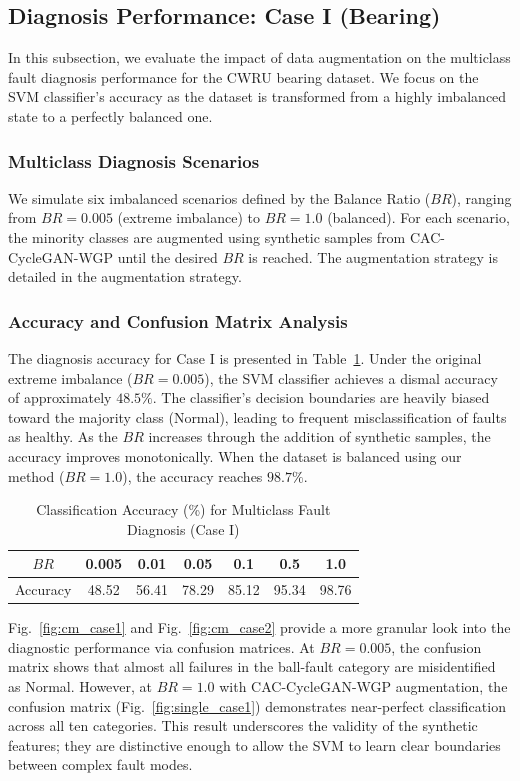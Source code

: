 \subsection{Diagnosis Performance: Case I (Bearing)}
In this subsection, we evaluate the impact of data augmentation on the multiclass fault diagnosis performance for the CWRU bearing dataset. We focus on the SVM classifier's accuracy as the dataset is transformed from a highly imbalanced state to a perfectly balanced one.

\subsubsection{Multiclass Diagnosis Scenarios}
We simulate six imbalanced scenarios defined by the Balance Ratio ($BR$), ranging from $BR=0.005$ (extreme imbalance) to $BR=1.0$ (balanced). For each scenario, the minority classes are augmented using synthetic samples from CAC-CycleGAN-WGP until the desired $BR$ is reached. The augmentation strategy is detailed in the augmentation strategy.

\subsubsection{Accuracy and Confusion Matrix Analysis}
The diagnosis accuracy for Case I is presented in Table~\ref{tab:acc_case1}. Under the original extreme imbalance ($BR=0.005$), the SVM classifier achieves a dismal accuracy of approximately $48.5\%$. The classifier's decision boundaries are heavily biased toward the majority class (Normal), leading to frequent misclassification of faults as healthy. As the $BR$ increases through the addition of synthetic samples, the accuracy improves monotonically. When the dataset is balanced using our method ($BR=1.0$), the accuracy reaches $98.7\%$.

\begin{table}[htbp]
\centering
\caption{Classification Accuracy (\%) for Multiclass Fault Diagnosis (Case I)}
\label{tab:acc_case1}
\begin{tabular}{ccccccc}
\hline
$BR$ & 0.005 & 0.01 & 0.05 & 0.1 & 0.5 & 1.0 \\ \hline
Accuracy & 48.52 & 56.41 & 78.29 & 85.12 & 95.34 & 98.76 \\
\hline
\end{tabular}
\end{table}

Fig.~\ref{fig:cm_case1} and Fig.~\ref{fig:cm_case2} provide a more granular look into the diagnostic performance via confusion matrices. At $BR=0.005$, the confusion matrix shows that almost all failures in the ball-fault category are misidentified as Normal. However, at $BR=1.0$ with CAC-CycleGAN-WGP augmentation, the confusion matrix (Fig.~\ref{fig:single_case1}) demonstrates near-perfect classification across all ten categories. This result underscores the validity of the synthetic features; they are distinctive enough to allow the SVM to learn clear boundaries between complex fault modes.

